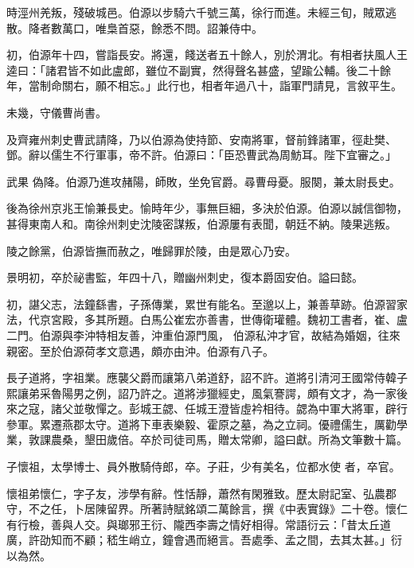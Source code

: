 \begin{pinyinscope}
 時涇州羌叛，殘破城邑。伯源以步騎六千號三萬，徐行而進。未經三旬，賊眾逃散。降者數萬口，唯梟首惡，餘悉不問。詔兼侍中。



 初，伯源年十四，嘗詣長安。將還，餞送者五十餘人，別於渭北。有相者扶風人王逵曰：「諸君皆不如此盧郎，雖位不副實，然得聲名甚盛，望踰公輔。後二十餘年，當制命關右，願不相忘。」此行也，相者年過八十，詣軍門請見，言敘平生。



 未幾，守儀曹尚書。



 及齊雍州刺史曹武請降，乃以伯源為使持節、安南將軍，督前鋒諸軍，徑赴樊、鄧。辭以儒生不行軍事，帝不許。伯源曰：「臣恐曹武為周魴耳。陛下宜審之。」



 武果
 偽降。伯源乃進攻赭陽，師敗，坐免官爵。尋曹母憂。服闋，兼太尉長史。



 後為徐州京兆王愉兼長史。愉時年少，事無巨細，多決於伯源。伯源以誠信御物，甚得東南人和。南徐州刺史沈陵密謀叛，伯源屢有表聞，朝廷不納。陵果逃叛。



 陵之餘黨，伯源皆撫而赦之，唯歸罪於陵，由是眾心乃安。



 景明初，卒於祕書監，年四十八，贈幽州刺史，復本爵固安伯。謚曰懿。



 初，諶父志，法鐘繇書，子孫傳業，累世有能名。至邈以上，兼善草跡。伯源習家法，代京宮殿，多其所題。白馬公崔宏亦善書，世傳衛瓘體。魏初工書者，崔、盧二門。伯源與李沖特相友善，沖重伯源門風，
 伯源私沖才官，故結為婚姻，往來親密。至於伯源荷孝文意遇，頗亦由沖。伯源有八子。



 長子道將，字祖業。應襲父爵而讓第八弟道舒，詔不許。道將引清河王國常侍韓子熙讓弟采魯陽男之例，詔乃許之。道將涉獵經史，風氣謇諤，頗有文才，為一家後來之寇，諸父並敬憚之。彭城王勰、任城王澄皆虛衿相待。勰為中軍大將軍，辟行參軍。累遷燕郡太守。道將下車表樂毅、霍原之墓，為之立祠。優禮儒生，厲勸學業，敦課農桑，墾田歲倍。卒於司徒司馬，贈太常卿，謚曰獻。所為文筆數十篇。



 子懷祖，太學博士、員外散騎侍郎，卒。子莊，少有美名，位都水使
 者，卒官。



 懷祖弟懷仁，字子友，涉學有辭。性恬靜，蕭然有閑雅致。歷太尉記室、弘農郡守，不之任，卜居陳留界。所著詩賦銘頌二萬餘言，撰《中表實錄》二十卷。懷仁有行檢，善與人交。與瑯邪王衍、隴西李壽之情好相得。常語衍云：「昔太丘道廣，許劭知而不顧；嵇生峭立，鐘會遇而絕言。吾處季、孟之間，去其太甚。」衍以為然。




\end{pinyinscope}
